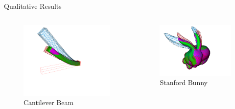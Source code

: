 \documentclass{beamer}
\begin{document}
\begin{frame}{Qualitative Results}
    \begin{columns}[T]
        \begin{column}{0.5\textwidth}            

            \begin{figure}
                \includegraphics[width=\textwidth]{Images/sofa_example_beam.png}
                \caption{Cantilever Beam}
            \end{figure}
        \end{column}
        \begin{column}{0.5\textwidth}
            \begin{figure}
                \includegraphics[width=\textwidth]{Images/sofa_example_bunny.png}
                \caption{Stanford Bunny}
            \end{figure}
        \end{column}
    \end{columns}
\end{frame}
\end{document}

